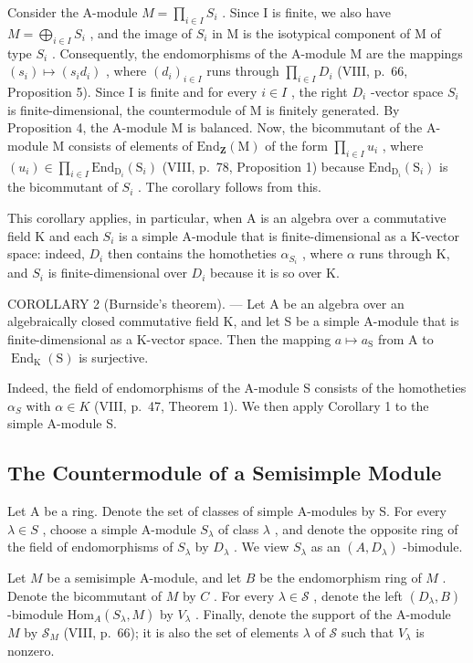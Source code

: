 Consider the A-module \(M = \prod_{i \in I} S_i\) . Since I is finite, we also have \(M = \bigoplus_{i \in I} S_i\) , and the image of \(S_i\) in M is the isotypical component of M of type \(S_i\) . Consequently, the endomorphisms of the A-module M are the mappings \((s_i) \mapsto (s_i d_i)\) , where \((d_i)_{i \in I}\) runs through \(\prod_{i \in I} D_i\) (VIII, p.~66, Proposition 5). Since I is finite and for every \(i \in I\) , the right \(D_i\) -vector space \(S_i\) is finite-dimensional, the countermodule of M is finitely generated. By Proposition 4, the A-module M is balanced. Now, the bicommutant of the A-module M consists of elements of \(\text{End}_{\mathbf{Z}}(\text{M})\) of the form \(\prod_{i \in I} u_i\) , where \((u_i) \in \prod_{i \in I} \text{End}_{\text{D}_i}(\text{S}_i)\) (VIII, p.~78, Proposition 1) because \(\text{End}_{\text{D}_i}(\text{S}_i)\) is the bicommutant of \(S_i\) . The corollary follows from this.

This corollary applies, in particular, when A is an algebra over a commutative field K and each \(S_{i}\) is a simple A-module that is finite-dimensional as a K-vector space: indeed, \(D_{i}\) then contains the homotheties \(\alpha_{S_{i}}\) , where \(\alpha\) runs through K, and \(S_{i}\) is finite-dimensional over \(D_{i}\) because it is so over K.

COROLLARY 2 (Burnside's theorem). --- Let A be an algebra over an algebraically closed commutative field K, and let S be a simple A-module that is finite-dimensional as a K-vector space. Then the mapping \(a \mapsto a_{\mathrm{S}}\) from A to \(\operatorname{End}_{\mathrm{K}}(\mathrm{S})\) is surjective.

Indeed, the field of endomorphisms of the A-module S consists of the homotheties \(\alpha_{S}\) with \(\alpha \in K\) (VIII, p.~47, Theorem 1). We then apply Corollary 1 to the simple A-module S.

\subsection{The Countermodule of a Semisimple Module}

Let A be a ring. Denote the set of classes of simple A-modules by S. For every \(\lambda \in S\) , choose a simple A-module \(S_{\lambda}\) of class \(\lambda\) , and denote the opposite ring of the field of endomorphisms of \(S_{\lambda}\) by \(D_{\lambda}\) . We view \(S_{\lambda}\) as an \((A, D_{\lambda})\) -bimodule.

Let \(M\) be a semisimple A-module, and let \(B\) be the endomorphism ring of \(M\) . Denote the bicommutant of \(M\) by \(C\) . For every \(\lambda \in \mathcal{S}\) , denote the left \((D_{\lambda}, B)\) -bimodule \(\mathrm{Hom}_A(S_{\lambda}, M)\) by \(V_{\lambda}\) . Finally, denote the support of the A-module \(M\) by \(\mathcal{S}_M\) (VIII, p.~66); it is also the set of elements \(\lambda\) of \(\mathcal{S}\) such that \(V_{\lambda}\) is nonzero.

